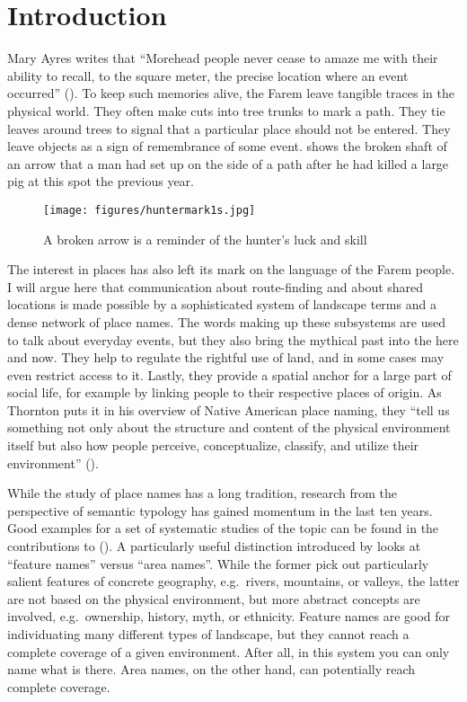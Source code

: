 \section{Introduction}\label{sec:introtolandscape}
Mary Ayres writes that ``Morehead people never cease to amaze me with their ability to recall, to the square meter, the precise location where an event occurred'' (\citeyear[174]{Ayres:1983dw}). To keep such memories alive, the Farem leave tangible traces in the physical world. They often make cuts into tree trunks to mark a path. They tie leaves around trees to signal that a particular place should not be entered. They leave objects as a sign of remembrance of some event.  shows the broken shaft of an arrow that a man had set up on the side of a path after he had killed a large pig at this spot the previous year.

\begin{figure}
    \texttt{[image: figures/huntermark1s.jpg]}
    \caption{A broken arrow is a reminder of the hunter's luck and skill}
    \label{fig:arrow}
\end{figure}

The interest in places has also left its mark on the language of the Farem people. I will argue here that communication about route-finding and about shared locations is made possible by a sophisticated system of landscape terms and a dense network of place names. The words making up these subsystems are used to talk about everyday events, but they also bring the mythical past into the here and now. They help to regulate the rightful use of land, and in some cases may even restrict access to it. Lastly, they provide a spatial anchor for a large part of social life, for example by linking people to their respective places of origin. As Thornton puts it in his overview of Native American place naming, they ``tell us something not only about the structure and content of the physical environment itself but also how people perceive, conceptualize, classify, and utilize their environment'' (\cite[209]{Thornton:1997uv}).

While the study of place names has a long tradition, research from the perspective of semantic typology has gained momentum in the last ten years. Good examples for a set of systematic studies of the topic can be found in the contributions to (\cite{Burenhult:2008jv}). A particularly useful distinction introduced by \citet{Burenhult:2008fp} looks at ``feature names'' versus ``area names''. While the former pick out particularly salient features of concrete geography, e.g.\ rivers, mountains, or valleys, the latter are not based on the physical environment, but more abstract concepts are involved, e.g.\ ownership, history, myth, or ethnicity. Feature names are good for individuating many different types of landscape, but they cannot reach a complete coverage of a given environment. After all, in this system you can only name what is there. Area names, on the other hand, can potentially reach complete coverage.

